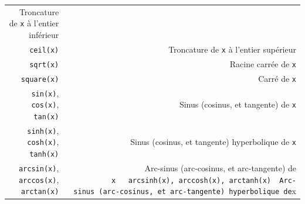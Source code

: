 \documentclass[12pt,]{book}
\numberwithin{equation}{section}
\numberwithin{countremarque}{section}
\begin{document}
\begin{longtable}[]{@{}rr@{}}
\begin{minipage}[t]{0.71\columnwidth}
Troncature de \texttt{x} à l'entier inférieur\strut
\end{minipage}\tabularnewline
\begin{minipage}[t]{0.18\columnwidth}\raggedleft\strut
\texttt{ceil(x)}\strut
\end{minipage} & \begin{minipage}[t]{0.71\columnwidth}\raggedleft\strut
Troncature de \texttt{x} à l'entier supérieur\strut
\end{minipage}\tabularnewline
\begin{minipage}[t]{0.18\columnwidth}\raggedleft\strut
\texttt{sqrt(x)}\strut
\end{minipage} & \begin{minipage}[t]{0.71\columnwidth}\raggedleft\strut
Racine carrée de \texttt{x}\strut
\end{minipage}\tabularnewline
\begin{minipage}[t]{0.18\columnwidth}\raggedleft\strut
\texttt{square(x)}\strut
\end{minipage} & \begin{minipage}[t]{0.71\columnwidth}\raggedleft\strut
Carré de \texttt{x}\strut
\end{minipage}\tabularnewline
\begin{minipage}[t]{0.18\columnwidth}\raggedleft\strut
\texttt{sin(x)}, \texttt{cos(x)}, \texttt{tan(x)}\strut
\end{minipage} & \begin{minipage}[t]{0.71\columnwidth}\raggedleft\strut
Sinus (cosinus, et tangente) de \texttt{x}\strut
\end{minipage}\tabularnewline
\begin{minipage}[t]{0.18\columnwidth}\raggedleft\strut
\texttt{sinh(x)}, \texttt{cosh(x)}, \texttt{tanh(x)}\strut
\end{minipage} & \begin{minipage}[t]{0.71\columnwidth}\raggedleft\strut
Sinus (cosinus, et tangente) hyperbolique de \texttt{x}\strut
\end{minipage}\tabularnewline
\begin{minipage}[t]{0.18\columnwidth}\raggedleft\strut
\texttt{arcsin(x)}, \texttt{arccos(x)}, \texttt{arctan(x)}\strut
\end{minipage} & \begin{minipage}[t]{0.71\columnwidth}\raggedleft\strut
Arc-sinus (arc-cosinus, et arc-tangente) de
\texttt{x\ \textbar{}\ \textbar{}\ \textasciigrave{}arcsinh(x)\textasciigrave{},\ \textasciigrave{}arccosh(x)\textasciigrave{},\ \textasciigrave{}arctanh(x)\textasciigrave{}\ \textbar{}\ Arc-sinus\ (arc-cosinus,\ et\ arc-tangente)\ hyperbolique\ de}x\strut

\end{minipage}
\end{longtable}
\end{document}
